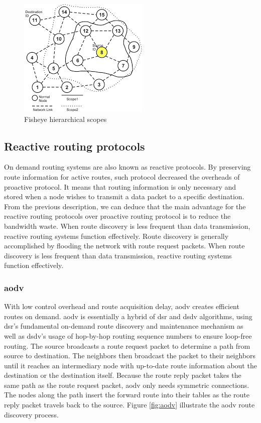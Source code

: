 \begin{figure}[!htb]
    \centering
    \includegraphics[scale=1]{images/fsr.png}
    \caption{Fisheye hierarchical scopes}
    \label{fig:fsr}
\end{figure}

\subsection{Reactive routing protocols}
On demand routing systems are also known as reactive protocols. By preserving route information for active routes, such protocol decreased the overheads of proactive protocol. It means that routing information is only necessary and stored when a node wishes to transmit a data packet to a specific destination. From the previous description, we can deduce that the main advantage for the reactive routing protocols over proactive routing protocol is to reduce the bandwidth waste. When route discovery is less frequent than data transmission, reactive routing systems function effectively\cite{unicast3}. Route discovery is generally accomplished by flooding the network with route request packets. When route discovery is less frequent than data transmission, reactive routing systems function effectively. 

\subsubsection{\acrfull{aodv}} 
With low control overhead and route acquisition delay, \acrfull{aodv} creates efficient routes on demand.
\acrshort{aodv} is essentially a hybrid of \acrfull{dsr} and \acrshort{dsdv} algorithms, using \acrshort{dsr}'s fundamental on-demand route discovery and maintenance mechanism as well as \acrshort{dsdv}'s usage of hop-by-hop routing sequence numbers to ensure loop-free routing. The source broadcasts a route request packet to determine a path from source to destination. The neighbors then broadcast the packet to their neighbors until it reaches an intermediary node with up-to-date route information about the destination or the destination itself. Because the route reply packet takes the same path as the route request packet, \acrshort{aodv} only needs symmetric connections. The nodes along the path insert the forward route into their tables as the route reply packet travels back to the source. Figure \ref{fig:aodv} illustrate the \acrshort{aodv} route discovery process. \cite{chakeres2004aodv} \cite{royer2000implementation}

